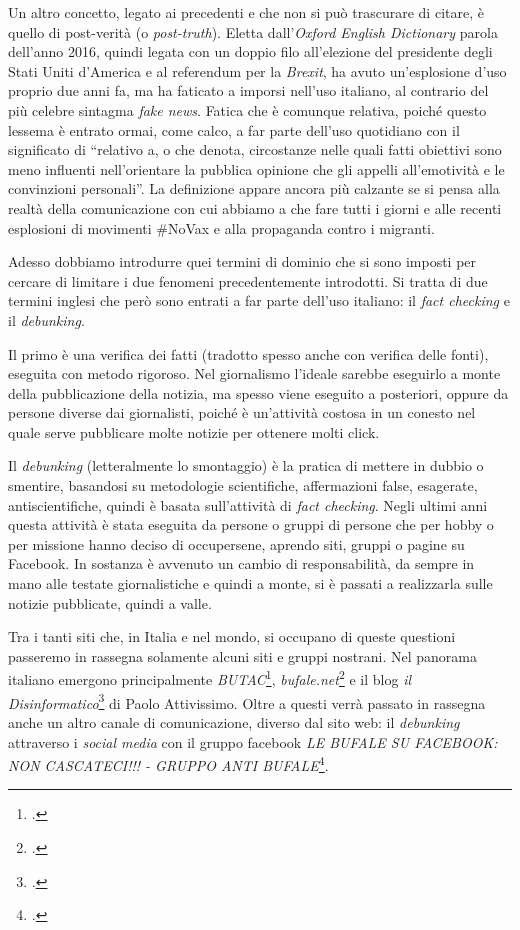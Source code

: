 \documentclass{article}
\begin{document}
Un altro concetto, legato ai precedenti e che non si può trascurare di citare, è quello di post-verità (o \textit{post-truth}). Eletta dall’\textit{Oxford English Dictionary} parola dell’anno 2016, quindi legata con un doppio filo all’elezione del presidente degli Stati Uniti d’America e al referendum per la \textit{Brexit}, ha avuto un’esplosione d’uso proprio due anni fa, ma ha faticato a imporsi nell’uso italiano, al contrario del più celebre sintagma \textit{fake news}. Fatica che è comunque relativa, poiché questo lessema è entrato ormai, come calco, a far parte dell’uso quotidiano con il significato di “relativo a, o che denota, circostanze nelle quali fatti obiettivi sono meno influenti nell’orientare la pubblica opinione che gli appelli all’emotività e le convinzioni personali”. La definizione appare ancora più calzante se si pensa alla realtà della comunicazione con cui abbiamo a che fare tutti i giorni e alle recenti esplosioni di movimenti \#NoVax e alla propaganda contro i migranti.

Adesso dobbiamo introdurre quei termini di dominio che si sono imposti per cercare di limitare i due fenomeni precedentemente introdotti. Si tratta di due termini inglesi che però sono entrati a far parte dell’uso italiano: il \textit{fact checking} e il \textit{debunking}. 

Il primo è una verifica dei fatti (tradotto spesso anche con verifica delle fonti), eseguita con metodo rigoroso. Nel giornalismo l’ideale sarebbe eseguirlo a monte della pubblicazione della notizia, ma spesso viene eseguito a posteriori, oppure da persone diverse dai giornalisti, poiché è un’attività costosa in un conesto nel quale serve pubblicare molte notizie per ottenere molti click. 

Il \textit{debunking} (letteralmente lo smontaggio) è la pratica di mettere in dubbio o smentire, basandosi su metodologie scientifiche, affermazioni false, esagerate, antiscientifiche, quindi è basata sull’attività di \textit{fact checking}. Negli ultimi anni questa attività è stata eseguita da persone o gruppi di persone che per hobby o per missione hanno deciso di occupersene, aprendo siti, gruppi o pagine su Facebook. In sostanza è avvenuto un cambio di responsabilità, da sempre in mano alle testate giornalistiche e quindi a monte, si è passati a realizzarla sulle notizie pubblicate, quindi a valle.

Tra i tanti siti che, in Italia e nel mondo, si occupano di queste questioni passeremo in rassegna solamente alcuni siti e gruppi nostrani. Nel panorama italiano emergono principalmente \textit{BUTAC}\footcite{noauthor_butac_nodate},  \textit{bufale.net}\footcite{noauthor_bufale.net_nodate} e il blog \textit{il Disinformatico}\footcite{noauthor_paolo_nodate} di Paolo Attivissimo. Oltre a questi verrà passato in rassegna anche un altro canale di comunicazione, diverso dal sito web: il \textit{debunking} attraverso i \textit{social media} con il gruppo facebook \textit{LE BUFALE SU FACEBOOK: NON CASCATECI!!! - GRUPPO ANTI BUFALE}\footcite{noauthor_bufale_nodate}.
 
\end{document}
